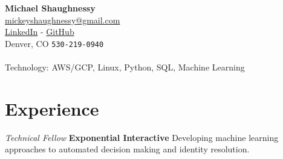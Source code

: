 \documentclass[11pt, a4paper]{article}
\newcommand{\years}[1]{\marginnote{\scriptsize #1}}
\begin{document}
{\LARGE \textbf{Michael Shaughnessy}}  \\[0.25cm]

{\color{hyperlinkcolor}\href{mailto:mickeyshaughnessy@gmail.com}{mickeyshaughnessy@gmail.com} \\ 
\href{https://www.linkedin.com/in/michaelshaughnessy1}{LinkedIn} - 
\href{https://github.com/mickeyshaughnessy}{GitHub} 
}
\\
Denver, CO
\texttt{530-219-0940}\\




 \\

Technology: AWS/GCP, Linux, Python, SQL, Machine Learning%

\section*{\color{mycolor4}\textbf{Experience}}
\noindent

\years{April 2019- }\emph{Technical Fellow }{\color{mycolor2}\textbf{Exponential Interactive}}
\newline \vspace{0.5em}
Developing machine learning approaches to automated decision making and identity resolution.\\
\end{document}
